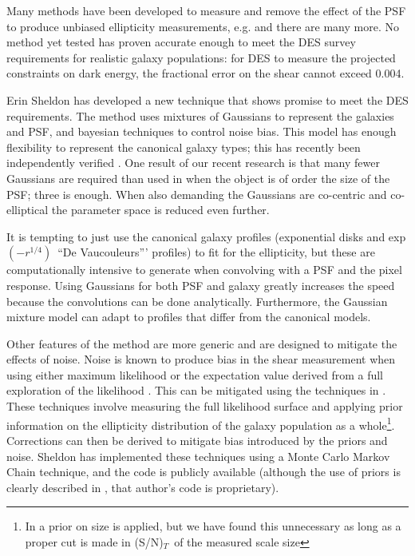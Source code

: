 \documentclass[12pt]{article}
\newcommand{\devauc}{De Vaucouleurs'}
\newcommand{\devprof}{exp$(-r^{1/4})$}
\newcommand{\snsize}{(S/N)$_{T}$}
\begin{document}
Many methods have been developed to measure and remove the effect of the PSF to
produce unbiased ellipticity measurements, e.g.
\cite{ksb95,Bern02,Miller07,Melchior11} and there are many more.  No method yet
tested has proven accurate enough to meet the DES survey requirements for
realistic galaxy populations:  for DES to measure the projected constraints on
dark energy, the fractional error on the shear cannot exceed 0.004.

Erin Sheldon has developed a new technique that shows promise to meet the DES
requirements.  The method uses mixtures of Gaussians to represent the galaxies
and PSF, and bayesian techniques to control noise bias.  This model has enough
flexibility to represent the canonical galaxy types; this has recently been
independently verified \citep{HoggGMix12}.  One result of our recent research
is that many fewer Gaussians are required than used in \cite{HoggGMix12} when
the object is of order the size of the PSF; three is enough.  When also
demanding the Gaussians are co-centric and co-elliptical the parameter space is
reduced even further.  

It is tempting to just use the canonical galaxy profiles (exponential disks and
\devprof\ ``\devauc'' profiles) to fit for the ellipticity, but these are
computationally intensive to generate when convolving with a PSF and the pixel
response.  Using Gaussians for both PSF and galaxy greatly increases the speed
because the convolutions can be done analytically.   Furthermore, the Gaussian
mixture model can adapt to profiles that differ from the canonical models.

Other features of the method are more generic and are designed to mitigate the
effects of noise.  Noise is known to produce bias in the shear measurement when
using either maximum likelihood \cite{Refreg12} or the expectation value
derived from a full exploration of the likelihood \cite{Miller12}.  This can be
mitigated using the techniques in \cite{Miller07,Miller12}. These techniques
involve measuring the full likelihood surface and applying prior information on
the ellipticity distribution of the galaxy population as a whole\footnote{In
\cite{Miller12} a prior on size is applied, but we have found this unnecessary
as long as a proper cut is made in \snsize\ of the measured scale size}.
Corrections can then be derived to mitigate bias introduced by the priors and
noise.  Sheldon has implemented these techniques using a Monte Carlo Markov
Chain technique, and the code is publicly available (although the use of priors
is clearly described in \cite{Miller07}, that author's code is proprietary).
\end{document}
